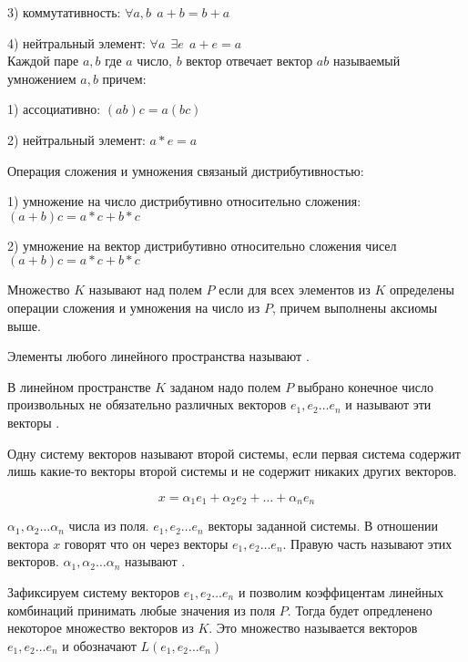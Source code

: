 3) коммутативность: $\forall a,b ~~ a+b = b+a$

4) нейтральный элемент: $\forall a ~~ \exists e ~~ a+e = a$\\

  Каждой паре $a,b$ где $a$ число, $b$ вектор отвечает вектор $ab$ называемый
умножением $a,b$ причем:

1) ассоциативно: $(ab)c = a(bc)$

2) нейтральный элемент: $a*e = a$

  Операция сложения и умножения связаный дистрибутивностью:

1) умножение на число дистрибутивно относительно сложения:$(a + b)c = a*c + b*c$

2) умножение на вектор дистрибутивно относительно сложения чисел
$(a + b)c = a*c + b*c$\\

\begin{defin}
  Множество $K$ называют  над полем $P$ если для всех
элементов из $K$ определены операции сложения и умножения на число из $P$,
причем выполнены аксиомы выше.
\end{defin}

  Элементы любого линейного пространства называют .

\begin{defin}
  В линейном пространстве $K$ заданом надо полем $P$ выбрано конечное число
произвольных не обязательно различных векторов $e_1, e_2 \ldots e_n$ и называют
эти векторы .
\end{defin}

\begin{defin}
  Одну систему векторов называют  второй системы, если первая
система содержит лишь какие-то векторы второй системы и не содержит никаких
других векторов.
\end{defin}

\[
  x = \alpha_1 e_1 + \alpha_2 e_2 + \ldots + \alpha_n e_n
\]

  $\alpha_1, \alpha_2 \ldots \alpha_n$ числа из поля. $e_1, e_2 \ldots e_n$
векторы заданной системы.  В отношении вектора $x$ говорят что он
 через векторы $e_1, e_2 \ldots e_n$. Правую часть
называют  этих векторов.
$\alpha_1, \alpha_2 \ldots \alpha_n$ называют
.

\begin{defin}
  Зафиксируем систему векторов $e_1, e_2 \ldots e_n$ и позволим
коэффицентам линейных комбинаций принимать любые значения из поля $P$. Тогда
будет опредленено некоторое множество векторов из $K$. Это множество называется
 векторов $e_1, e_2 \ldots e_n$ и
обозначают $L(e_1, e_2 \ldots e_n)$
\end{defin}

